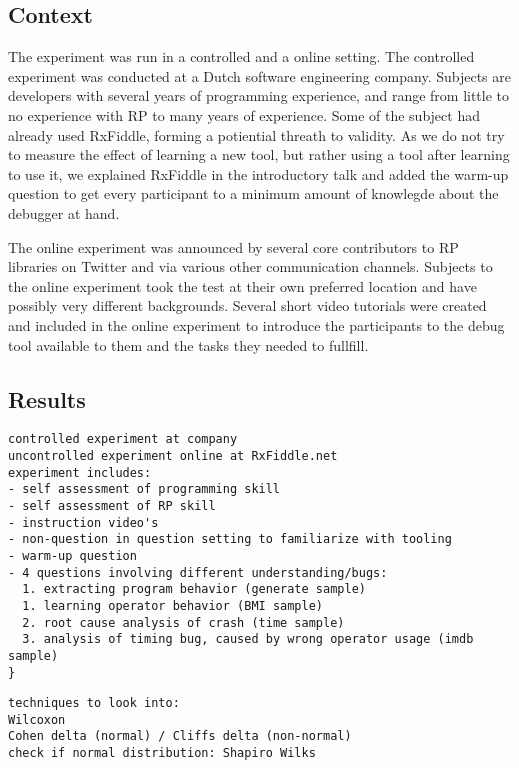
\subsection{Context}
The experiment was run in a controlled and a online setting.
The controlled experiment was conducted at a Dutch software engineering company. Subjects are developers with several years of programming experience, and range from little to no experience with RP to many years of experience. Some of the subject had already used RxFiddle, forming a potiential threath to validity. As we do not try to measure the effect of learning a new tool, but rather using a tool after learning to use it, we explained RxFiddle in the introductory talk and added the warm-up question to get every participant to a minimum amount of knowlegde about the debugger at hand.

The online experiment was announced by several core contributors to RP libraries on Twitter and via various other communication channels. Subjects to the online experiment took the test at their own preferred location and have possibly very different backgrounds. Several short video tutorials were created and included in the online experiment to introduce the participants to the debug tool available to them and the tasks they needed to fullfill.

\subsection{Results}

{
\color{red}
\begin{verbatim}
controlled experiment at company
uncontrolled experiment online at RxFiddle.net
experiment includes:
- self assessment of programming skill
- self assessment of RP skill
- instruction video's
- non-question in question setting to familiarize with tooling
- warm-up question
- 4 questions involving different understanding/bugs:
  1. extracting program behavior (generate sample)
  1. learning operator behavior (BMI sample)
  2. root cause analysis of crash (time sample)
  3. analysis of timing bug, caused by wrong operator usage (imdb sample)
}
\end{verbatim}
\begin{verbatim}
techniques to look into:
Wilcoxon
Cohen delta (normal) / Cliffs delta (non-normal)
check if normal distribution: Shapiro Wilks
\end{verbatim}
}